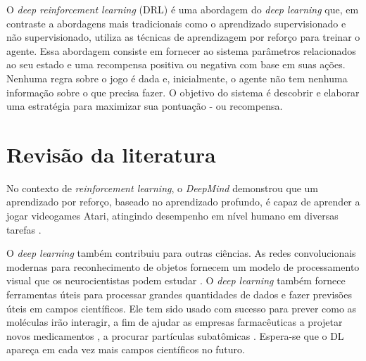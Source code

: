 
O \textit{deep reinforcement learning} (DRL) é uma abordagem do \textit{deep learning} que, em contraste a abordagens mais tradicionais como o aprendizado supervisionado e não supervisionado, utiliza as técnicas de aprendizagem por reforço para treinar o agente. Essa abordagem consiste em fornecer ao sistema parâmetros relacionados ao seu estado e uma recompensa positiva ou negativa com base em suas ações. Nenhuma regra sobre o jogo é dada e, inicialmente, o agente não tem nenhuma informação sobre o que precisa fazer. O objetivo do sistema é descobrir e elaborar uma estratégia para maximizar sua pontuação - ou recompensa.






\section{Revisão da literatura }

No contexto de \textit{reinforcement learning}, o \textit{DeepMind} demonstrou que um aprendizado por reforço, baseado no aprendizado profundo, é capaz de aprender a jogar videogames Atari, atingindo desempenho em nível humano em diversas tarefas \cite{mnih-human-control-drl}.

O \textit{deep learning} também contribuiu para outras ciências. As redes convolucionais modernas para reconhecimento de objetos fornecem um modelo de processamento visual que os neurocientistas podem estudar \cite{dicarlo-afrax-yamins:2014}. O \textit{deep learning} também fornece ferramentas úteis para processar grandes quantidades de dados e fazer previsões úteis em campos científicos. Ele tem sido usado com sucesso para prever como as moléculas irão interagir, a fim de ajudar as empresas farmacêuticas a projetar novos medicamentos \cite{dahl2014multitask}, a procurar partículas subatômicas \cite{baldi:s:w:2015}. Espera-se que o DL apareça em cada vez mais campos científicos no futuro.







